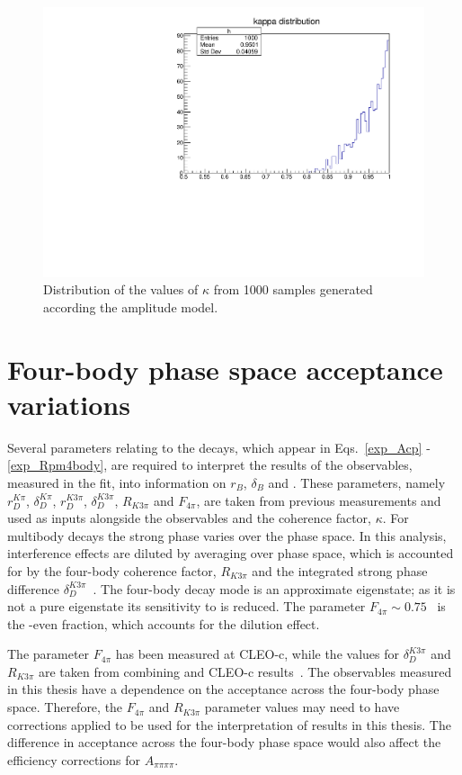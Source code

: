 \begin{figure}[h]
\centering
\includegraphics[trim = 0mm 0mm 0mm 8mm, clip, width=0.5\linewidth]{figures/results/kappa.pdf}
\caption{Distribution of the values of $\kappa$ from 1000 samples generated according the amplitude model.}
\label{kappadistribution}
\end{figure}

\section{Four-body phase space acceptance variations}
\label{sec:interpretation:inputs}

Several parameters relating to the \Dz decays, which appear in Eqs.~\ref{exp_Acp} - \ref{exp_Rpm4body}, are required to interpret the results of the \CP observables, measured in the \CP fit, into information on $r_B$, $\delta_B$ and \Pgamma. These parameters, namely $r_D^{K\pi}$, $\delta_D^{K\pi}$, $r_D^{K3\pi}$, $\delta_D^{K3\pi}$, $R_{K3\pi}$ and $F_{4\pi}$, are taken from previous measurements and used as inputs alongside the \CP observables and the coherence factor, $\kappa$. For multibody \decay{\Dz}{\Kmp\pipm\pimp\pipm} decays the strong phase varies over the phase space. In this analysis, interference effects are diluted by averaging over phase space, which is accounted for by the four-body coherence factor, $R_{K3\pi}$ and the integrated strong phase difference $\delta_D^{K3\pi}$~\cite{charmk3pi,charmk3pi_errata,LHCb-PAPER-2015-057}. The four-body \Dz decay mode \decay{\Dz}{\pip\pim\pip\pim} is an approximate \CP eigenstate; as it is not a pure \CP eigenstate its sensitivity to \Pgamma is reduced. The parameter $F_{4\pi} \sim 0.75$~\cite{charm4pi} is the \CP-even fraction, which accounts for the dilution effect.

The parameter $F_{4\pi}$ has been measured at CLEO-c, while the values for $\delta_D^{K3\pi}$ and $R_{K3\pi}$ are taken from combining \lhcb and CLEO-c results~\cite{charmk3pi,charmk3pi_errata,LHCb-PAPER-2015-057,charm4pi}. The observables measured in this thesis have a dependence on the \lhcb acceptance across the four-body phase space. Therefore, the $F_{4\pi}$ and $R_{K3\pi}$ parameter values may need to have corrections applied to be used for the interpretation of results in this thesis. The difference in \lhcb acceptance across the four-body phase space would also affect the efficiency corrections for $A_{\pi\pi\pi\pi}$.

